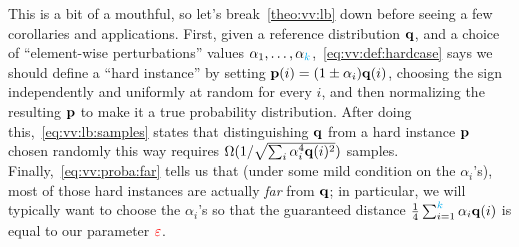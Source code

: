 This is a bit of a mouthful, so let's break~\cref{theo:vv:lb} down before seeing a few corollaries and applications. First, given a reference distribution $\mathbf{q}$, and a choice of ``element-wise perturbations'' values $\alpha_1,\dots,\alpha_{\textcolor{cyan}{k}}$,~\cref{eq:vv:def:hardcase} says we should define a ``hard instance'' by setting $\mathbf{p}(i) = (1\pm \alpha_i)\mathbf{q}(i)$, choosing the sign independently and uniformly at random for every $i$, and then normalizing the resulting $\mathbf{p}$ to make it a true probability distribution. After doing this,~\cref{eq:vv:lb:samples} states that distinguishing $\mathbf{q}$ from a hard instance $\mathbf{p}$ chosen randomly this way requires
$
\Omega(1/\sqrt{\sum_i \alpha_i^4\mathbf{q}(i)^2})
$ samples. Finally,~\cref{eq:vv:proba:far} tells us that (under some mild condition on the $\alpha_i$'s), most of those hard instances are actually \emph{far} from $\mathbf{q}$; in particular, we will typically want to choose the $\alpha_i$'s so that the guaranteed distance
$
\frac{1}{4}\sum_{i=1}^{\textcolor{cyan}{k}} \alpha_i\mathbf{q}(i)
$ is equal to our parameter $\textcolor{red}{\varepsilon}$.\medskip

